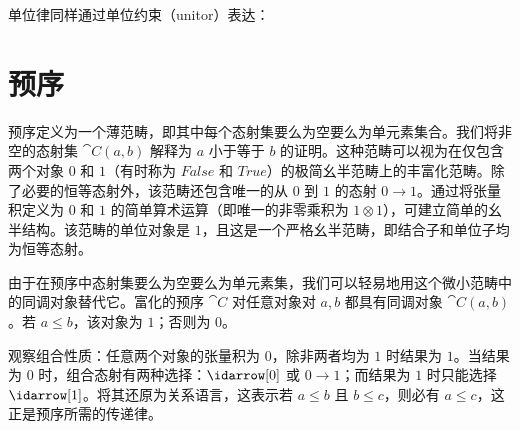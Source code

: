 \noindent
单位律同样通过单位约束（unitor）表达：

\begin{figure}[H]
  \centering
  \begin{subfigure}
    \centering
  \end{subfigure}
  \hspace{1cm}
  \begin{subfigure}
    \centering
  \end{subfigure}
\end{figure}

\section{预序}

预序定义为一个薄范畴，即其中每个态射集要么为空要么为单元素集合。我们将非空的态射集 $\cat{C}(a, b)$ 解释为 $a$ 小于等于 $b$ 的证明。这种范畴可以视为在仅包含两个对象 $0$ 和 $1$（有时称为 $\mathit{False}$ 和 $\mathit{True}$）的极简幺半范畴上的丰富化范畴。除了必要的恒等态射外，该范畴还包含唯一的从 $0$ 到 $1$ 的态射 $0 \to 1$。通过将张量积定义为 $0$ 和 $1$ 的简单算术运算（即唯一的非零乘积为 $1 \otimes 1$），可建立简单的幺半结构。该范畴的单位对象是 $1$，且这是一个严格幺半范畴，即结合子和单位子均为恒等态射。

由于在预序中态射集要么为空要么为单元素集，我们可以轻易地用这个微小范畴中的同调对象替代它。富化的预序 $\cat{C}$ 对任意对象对 $a,b$ 都具有同调对象 $\cat{C}(a, b)$。若 $a \leqslant b$，该对象为 $1$；否则为 $0$。

观察组合性质：任意两个对象的张量积为 $0$，除非两者均为 $1$ 时结果为 $1$。当结果为 $0$ 时，组合态射有两种选择：$\idarrow[0]$ 或 $0 \to 1$；而结果为 $1$ 时只能选择 $\idarrow[1]$。将其还原为关系语言，这表示若 $a \leqslant b$ 且 $b \leqslant c$，则必有 $a \leqslant c$，这正是预序所需的传递律。


